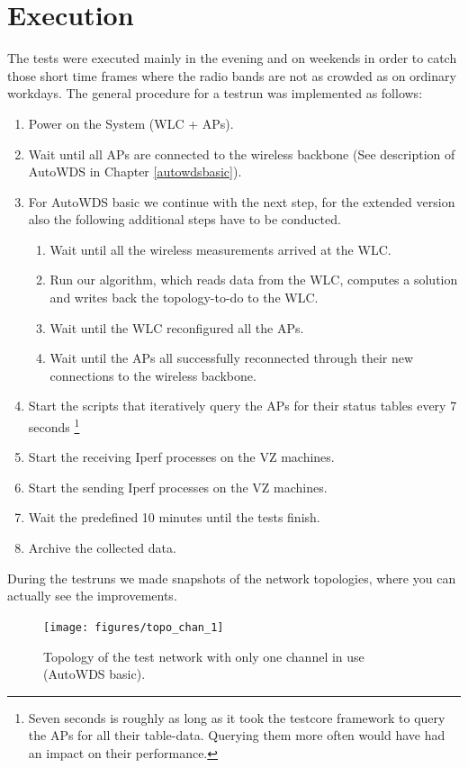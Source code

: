   \section{Execution}
    The tests were executed mainly in the evening and on weekends in order to catch those short time frames where the radio bands are not as crowded as on ordinary workdays.
    The general procedure for a testrun was implemented as follows:
    \begin{enumerate}
      \item Power on the System (\ac{WLC} + APs).
      \item Wait until all APs are connected to the wireless backbone (See description of AutoWDS in Chapter \ref{autowdsbasic}).
      \item For AutoWDS basic we continue with the next step, for the extended version also the following additional steps have to be conducted.
	\begin{enumerate}
	 \item Wait until all the wireless measurements arrived at the \ac{WLC}.
	 \item Run our algorithm, which reads data from the \ac{WLC}, computes a solution and writes back the topology-to-do to the \ac{WLC}.
	 \item Wait until the \ac{WLC} reconfigured all the APs.
	 \item Wait until the APs all successfully reconnected through their new connections to the wireless backbone.
	\end{enumerate}
      \item Start the scripts that iteratively query the APs for their status tables every 7 seconds \footnote{Seven seconds is roughly as long as it took the testcore
      framework to query the APs for all their table-data. Querying them more often would have had an impact on their performance.}
      \item Start the receiving Iperf processes on the VZ machines.
      \item Start the sending Iperf processes on the VZ machines.
      \item Wait the predefined 10 minutes until the tests finish.
      \item Archive the collected data.
    \end{enumerate}
    
\newpage

    During the testruns we made snapshots of the network topologies, where you can actually see the improvements.    
    \begin{figure}[h!]
      \centering
	\texttt{[image: figures/topo\_chan\_1]}
	\caption{Topology of the test network with only one channel in use (AutoWDS basic).\protect\footnotemark }
      \label{fig:topo_chan_1}
    \end{figure}
    
